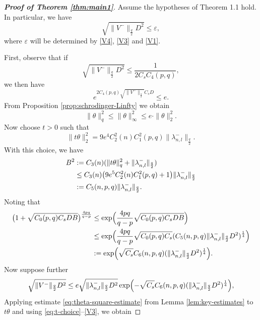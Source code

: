 \documentclass[12pt, twoside]{article}
\theoremstyle{definition}
\numberwithin{equation}{section}
\def \la {\lambda}
\begin{document}
	\begin{proof}[\textbf{Proof of Theorem \ref{thm:main1}}]
		Assume the hypotheses of Theorem 1.1 hold. In particular, we have
		\[
		\sqrt{\|V^{-}\|_\frac{q}{2} D^2} \le \varepsilon,
		\]
		where \(\varepsilon\) will be determined by \eqref{V4},  \eqref{V3} and \eqref{V1}.  
			
First, observe that if
\begin{equation}\label{V4}
\sqrt{\|V^{-}\|_\frac{q}{2} D^2} \le \frac{1}{2C_s C_{4}(p,q)},
\end{equation}
we then have
\begin{equation}\label{V2}
e^{2C_{4}(p,q)\sqrt{\|V^{-}\|_{\frac{q}{2}}}C_{s}D}\leq e.
\end{equation}    
From Proposition \ref{prop:schrodinger-Linfty} we obtain
\begin{equation}\label{eq:theta-infinity-bound}
\|\theta\|^{2}_{q}\leq\|\theta\|^{2}_\infty \le e \cdot \|\theta\|^{2}_2.
\end{equation}    
Now choose \(t > 0\) such that
		\begin{equation}\label{eq:t-choice}
		\|t\theta\|_2^2 = 9e^4 C_2^2(n) C^2_1(p,q) \|\la^{-}_{n,l}\|_\frac{q}{2}.
		\end{equation}    
		With this choice, we have
		\begin{align*}
		B^2 &:= C_3(n)(\|t\theta\|_{q}^2 +\|\la^{-}_{n,l}\|_\frac{q}{2}) \\
		&\le C_{3}(n)\big{(}9e^5 C_2^2(n) C^2_1(p,q)+1\big{)} \|\la^{-}_{n,l}\|_\frac{q}{2}\\
		&:=C_5(n,p,q) \|\la^{-}_{n,l}\|_\frac{q}{2}. 
		\end{align*}    
Noting that
	\begin{align*}
		\bigl(1 + \sqrt{C_0(p,q)C_s D B}\bigr)^{\frac{4pq}{q-p}}
		&\le \exp\Bigl(\frac{4pq}{q-p}\sqrt{C_0(p,q)C_s D B}\Bigr) \\
		&\le \exp\Bigl(\frac{4pq}{q-p} \sqrt{C_0(p,q)C_s}(C_{5}(n,p,q)\|\la^{-}_{n,l}\|_{\frac{q}{2}}D^{2})^{\frac{1}{4}} \Bigr)\\
		&:=\exp\Bigl(\sqrt{C_s}C_6(n,p,q)(\|\la^{-}_{n,l}\|_{\frac{q}{2}}D^{2})^{\frac{1}{4}}\Bigr ).
		\end{align*}	
Now suppose further 
\begin{equation}	\label{V3}
\sqrt{\|V^{-}\|_\frac{q}{2} D^2} \le e\sqrt{\|\la^{-}_{n,l}\|_{\frac{q}{2}}D^{2}}\exp\Bigl(-\sqrt{C_s}C_6(n,p,q)(\|\la^{-}_{n,l}\|_{\frac{q}{2}}D^{2})^{\frac{1}{4}}\Bigr ),
\end{equation}				
Applying estimate \eqref{eq:theta-square-estimate} from Lemma \ref{lem:key-estimates} to \(t\theta\) and using \eqref{eq:t-choice}--\eqref{V3}, we obtain

\end{proof}
\end{document}
